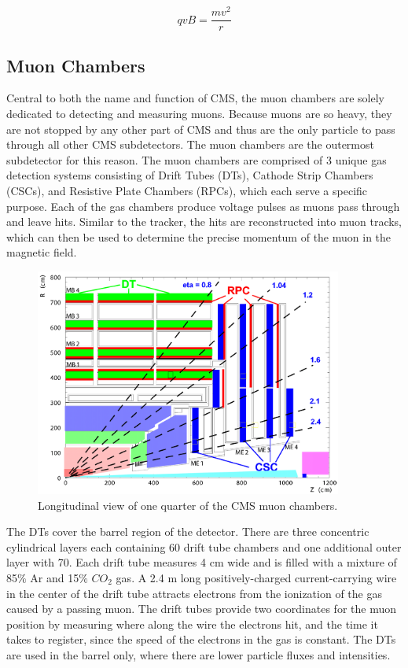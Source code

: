 \begin{equation}
\label{eqn:lorentz_qvb}
 qvB = \frac{mv^{2}}{r}
\end{equation}

\subsection{Muon Chambers}
Central to both the name and function of CMS, the muon chambers are solely dedicated to detecting and measuring muons.
Because muons are so heavy, they are not stopped by any other part of CMS and thus are the only particle to pass through all other CMS subdetectors.
The muon chambers are the outermost subdetector for this reason. The muon chambers are comprised of 3 unique gas detection systems consisting of Drift Tubes (DTs),
Cathode Strip Chambers (CSCs), and Resistive Plate Chambers (RPCs), which each serve a specific purpose. Each of the gas chambers produce voltage pulses as muons pass through and leave hits.
Similar to the tracker, the hits are reconstructed into muon tracks, which can then be used to determine the precise momentum of the muon in the magnetic field.  

\begin{figure}[hbtp]
 \begin{center}
   \includegraphics[width=0.9\textwidth]{ch3_figs/cms_muonchamber.pdf}
   \caption[Longitudinal view of the CMS muon chambers]{Longitudinal view of one quarter of the CMS muon chambers.}
   \label{fig:cms_muonchamber}
 \end{center}
\end{figure}

The DTs cover the barrel region of the detector. There are three concentric cylindrical layers each containing 60 drift tube chambers and one additional outer layer with 70.
Each drift tube measures 4 cm wide and is filled with a mixture of 85$\%$ Ar and 15$\%$ $CO_{2}$ gas. A 2.4 m long positively-charged current-carrying wire in the center of the drift tube attracts electrons
from the ionization of the gas caused by a passing muon. The drift tubes provide two coordinates for the muon position by measuring where along the wire the
electrons hit, and the time it takes to register, since the speed of the electrons in the gas is constant. The DTs are used in the barrel only, where there are lower particle fluxes
and intensities. 

